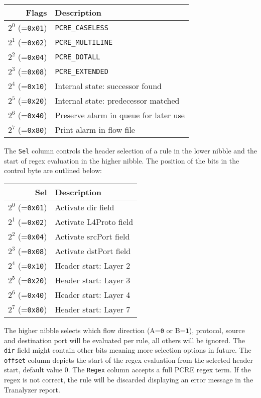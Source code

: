 \documentclass[documentation]{subfiles}
\begin{document}
\begin{longtable}{rl}
    \toprule
    {\bf Flags} & {\bf Description} \\
    \midrule\endhead%
    $2^0$ (={\tt 0x01}) & {\tt PCRE\_CASELESS} \\
    $2^1$ (={\tt 0x02}) & {\tt PCRE\_MULTILINE} \\
    $2^2$ (={\tt 0x04}) & {\tt PCRE\_DOTALL} \\
    $2^3$ (={\tt 0x08}) & {\tt PCRE\_EXTENDED} \\
    $2^4$ (={\tt 0x10}) & Internal state: successor found \\
    $2^5$ (={\tt 0x20}) & Internal state: predecessor matched \\
    $2^6$ (={\tt 0x40}) & Preserve alarm in queue for later use \\
    $2^7$ (={\tt 0x80}) & Print alarm in flow file \\
    \bottomrule
\end{longtable}

The {\tt Sel} column controls the header selection of a rule in the lower nibble and the start of regex evaluation
in the higher nibble. The position of the bits in the control byte are outlined below:

\begin{longtable}{rl}
    \toprule
    {\bf Sel} & {\bf Description} \\
    \midrule\endhead%
    $2^0$ (={\tt 0x01}) & Activate dir field \\
    $2^1$ (={\tt 0x02}) & Activate L4Proto field \\
    $2^2$ (={\tt 0x04}) & Activate srcPort field \\
    $2^3$ (={\tt 0x08}) & Activate dstPort field \\
    $2^4$ (={\tt 0x10}) & Header start: Layer 2 \\
    $2^5$ (={\tt 0x20}) & Header start: Layer 3 \\
    $2^6$ (={\tt 0x40}) & Header start: Layer 4 \\
    $2^7$ (={\tt 0x80}) & Header start: Layer 7 \\
    \bottomrule
\end{longtable}

The higher nibble selects which flow direction (A={\tt 0} or B={\tt 1}), protocol, source and destination port will be
evaluated per rule, all others will be ignored. The {\tt dir} field might contain other bits meaning more selection
options in future.
The {\tt offset} column depicts the start of the regex evaluation from the selected header start, default value 0.
The {\tt Regex} column accepts a full PCRE regex term. If the regex is not correct, the rule will be discarded
displaying an error message in the Tranalyzer report.
\end{document}

